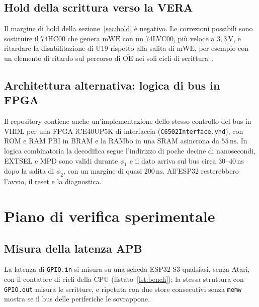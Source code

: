 \documentclass[11pt,a4paper,twoside,openright]{report}
\newcommand{\ns}{\,\mathrm{ns}}
\DeclareRobustCommand{\code}[1]{\begingroup\renewcommand{\_}{\textunderscore\allowbreak}\texttt{#1}\endgroup}
\newcommand{\sig}[1]{\textsf{#1}}
\begin{document}
\section{Hold della scrittura verso la VERA}
\label{sec:aperta-hold}

Il margine di hold della sezione~\ref{sec:hold} è negativo. Le correzioni possibili sono
sostituire il 74HC00 che genera $\overline{\text{mWE}}$ con un 74LVC00, più veloce a
$3{,}3\,\mathrm{V}$, e ritardare la disabilitazione di U19 rispetto alla salita di
$\overline{\text{mWE}}$, per esempio con un elemento di ritardo sul percorso di
$\overline{\text{OE}}$ nei soli cicli di scrittura~\cite[§2.2]{hwreq}.

\section{Architettura alternativa: logica di bus in FPGA}
\label{sec:fpga}

Il repository contiene anche un'implementazione dello stesso controllo del bus in VHDL per
una FPGA iCE40UP5K di interfaccia (\code{C6502\_Interface.vhd}), con ROM e RAM PBI in BRAM
e la RAMbo in una SRAM asincrona da $55\ns$. In logica combinatoria la decodifica segue
l'indirizzo di poche decine di nanosecondi, \sig{EXTSEL} e \sig{MPD} sono validi durante
$\phi_1$ e il dato arriva sul bus circa $30$--$40\ns$ dopo la salita di $\phi_2$, con un
margine di quasi $200\ns$. All'ESP32 resterebbero l'avvio, il reset e la diagnostica.

\chapter{Piano di verifica sperimentale}
\label{cap:verifica}

\section{Misura della latenza APB}
\label{sec:mis-lapb}

La latenza di \code{GPIO.in} si misura su una scheda ESP32-S3 qualsiasi, senza Atari, con
il contatore di cicli della CPU (listato~\ref{lst:bench}); la stessa struttura con
\code{GPIO.out} misura le scritture, e ripetuta con due store consecutivi senza \code{memw}
mostra se il bus delle periferiche le sovrappone.
\end{document}
